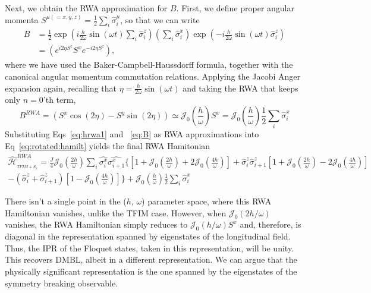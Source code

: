 \documentclass[aps,prb,reprint,showpacs,floatfix,superscriptaddress, onecolumn, nofootinbib, 9pt]{revtex4-2}
\begin{document}
\begin{enumerate}
{			Next, we obtain the RWA approximation for $B$. First, we define proper angular momenta $\displaystyle S^{\mu(=x,y,z)} = \frac12\sum_i \hat{\sigma}^\mu_i$, so that we can write
			\begin{align*}
				B & =\frac{1}{2} \exp \left(i \frac{h}{2 \omega} \sin (\omega t) \sum_{i} \hat{\sigma}_{i}^{z}\right)\left(\sum_{i} \hat{\sigma}_{i}^{x}\right) \exp \left(-i \frac{h}{2 \omega} \sin (\omega t) \hat{\sigma}_{i}^{z}\right) \\
				& =\left(e^{i 2 \eta S^{z}} S^{x} e^{-i 2 \eta S^{z}}\right),
			\end{align*}
			where we have used the Baker-Campbell-Haussdorff formula, together with the canonical angular momentum commutation relations. Applying the Jacobi Anger expansion again, recalling that $\eta=\frac{h}{2 \omega} \sin (\omega t)$ and taking the RWA that keeps only $n=0$'th term,
			\begin{equation}
				B^{RWA} = \left(S^{x} \cos (2 \eta)-S^{y} \sin (2 \eta)\right) \simeq \mathcal{J}_{0}\left(\frac{h}{\omega}\right) S^{x} = \mathcal{J}_{0}\left(\frac{h}{\omega}\right)\frac12\sum_i\hat{\sigma}^x_i
				\label{eq:B}
			\end{equation}
			Substituting Eqs~\ref{eq:hrwa1} and ~\ref{eq:B} as RWA approximations into Eq~\ref{eq:rotated:hamilt} yields the final RWA Hamitonian
			\begin{multline}
				\hat{\mathcal{H}}_{_{TFIM+S_{x}}}^{R W A}=\frac{J}{4}\mathcal{J}_0\left(\frac{2h}{\omega}\right)\sum_i \hat{\sigma^x_i} \hat{\sigma^x_{i+1}} \Bigg\{\left[1+\mathcal{J}_0\left(\frac{2h}{\omega}\right) + 2\mathcal{J}_0\left(\frac{4h}{\omega}\right)\right] +\hat{\sigma}^z_i\hat{\sigma}^z_{i+1}\left[1+\mathcal{J}_0\left(\frac{2h}{\omega}\right)-2\mathcal{J}_0\left(\frac{4h}{\omega}\right)\right]\\ -\left(\hat{\sigma}^z_i+\hat{\sigma}^z_{i+1}\right)\left[1-\mathcal{J}_0\left(\frac{4h}{\omega}\right)\right]\Bigg\} +\mathcal{J}_{0}\left(\frac{h}{\omega}\right) \frac12\sum_i\hat{\sigma}^x_i
				\label{eq:tfimpsx}
			\end{multline}
		
		There isn't a single point in the ($h$, $\omega$) parameter space,  where this RWA Hamiltonian vanishes, unlike the TFIM case. However, when $\mathcal{J}_0(2h/\omega)$ vanishes, the RWA Hamiltonian simply reduces to $\mathcal{J}_0(h/\omega) S^x$ and, therefore, is diagonal in the representation spanned by eigenstates of the longitudinal field. Thus, the IPR of the Floquet states, taken in this representation, will be unity. This recovers DMBL, albeit in a different representation. We can argue that the physically significant representation is the one spanned by the eigenstates of the symmetry breaking observable.}


\end{enumerate}
\end{document}
